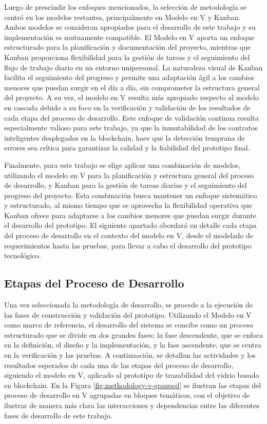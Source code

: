 Luego de prescindir los enfoques mencionados, la selección de metodología se centró en los modelos restantes, principalmente en Modelo en V y Kanban. Ambos modelos se consideran apropiados para el desarrollo de este trabajo y su implementación es mutuamente compatible. El Modelo en V aporta un enfoque estructurado para la planificación y documentación del proyecto, mientras que Kanban proporciona flexibilidad para la gestión de tareas y el seguimiento del flujo de trabajo diario en un entorno unipersonal. La naturaleza visual de Kanban facilita el seguimiento del progreso y permite una adaptación ágil a los cambios menores que puedan surgir en el día a día, sin comprometer la estructura general del proyecto. A su vez, el modelo en V resulta más apropiado respecto al modelo en cascada debido a su foco en la verificación y validación de los resultados de cada etapa del proceso de desarrollo. Este enfoque de validación continua resulta especialmente valioso para este trabajo, ya que la inmutabilidad de los contratos inteligentes desplegados en la blockchain, hace que la detección temprana de errores sea crítica para garantizar la calidad y la fiabilidad del prototipo final. 

Finalmente, para este trabajo se elige aplicar una combinación de modelos, utilizando el modelo en V para la planificación y estructura general del proceso de desarrollo, y Kanban para la gestión de tareas diarias y el seguimiento del progreso del proyecto. Esta combinación busca mantener un enfoque sistemático y estructurado, al mismo tiempo que se aprovecha la flexibilidad operativa que Kanban ofrece para adaptarse a los cambios menores que puedan surgir durante el desarrollo del prototipo. El siguiente apartado abordará en detalle cada etapa del proceso de desarrollo en el contexto del modelo en V, desde el modelado de requerimientos hasta las pruebas, para llevar a cabo el desarrollo del prototipo tecnológico.

\subsection{Etapas del Proceso de Desarrollo}

Una vez seleccionada la metodología de desarrollo, se procede a la ejecución de las fases de construcción y validación del prototipo. Utilizando el Modelo en V como marco de referencia, el desarrollo del sistema se concibe como un proceso estructurado que se divide en dos grandes fases: la fase descendente, que se enfoca en la definición, el diseño y la implementación, y la fase ascendente, que se centra en la verificación y las pruebas. A continuación, se detallan las actividades y los resultados esperados de cada una de las etapas del proceso de desarrollo, siguiendo el modelo en V, aplicado al prototipo de trazabilidad del vidrio basado en blockchain. En la Figura \ref{fig:methodology-v-grouped} se ilustran las etapas del proceso de desarrollo en V agrupadas en bloques temáticos, con el objetivo de ilustrar de manera más clara las interacciones y dependencias entre las diferentes fases de desarrollo de este trabajo.

